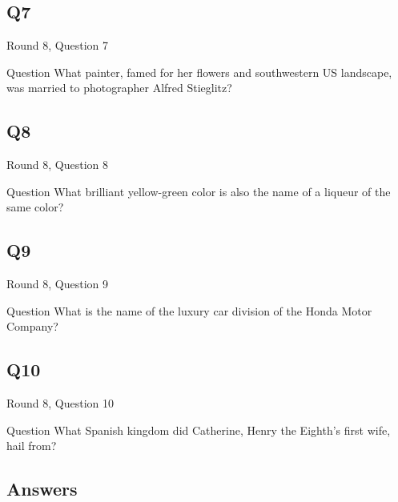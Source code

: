 \documentclass[11pt]{beamer}
\begin{document}
\subsection*{Q7}
\begin{frame}[t]{Round 8, Question 7}
\vspace{2em}
\begin{block}{Question}
What painter, famed for her flowers and southwestern US landscape, was married to photographer Alfred Stieglitz\@?
\end{block}
\end{frame}
    

\subsection*{Q8}
\begin{frame}[t]{Round 8, Question 8}
\vspace{2em}
\begin{block}{Question}
What brilliant yellow-green color is also the name of a liqueur of the same color\@?
\end{block}
\end{frame}
    

\subsection*{Q9}
\begin{frame}[t]{Round 8, Question 9}
\vspace{2em}
\begin{block}{Question}
What is the name of the luxury car division of the Honda Motor Company\@?
\end{block}
\end{frame}
    

\subsection*{Q10}
\begin{frame}[t]{Round 8, Question 10}
\vspace{2em}
\begin{block}{Question}
What Spanish kingdom did Catherine, Henry the Eighth's first wife, hail from\@?
\end{block}
\end{frame}
    
\subsection{Answers}
\end{document}

